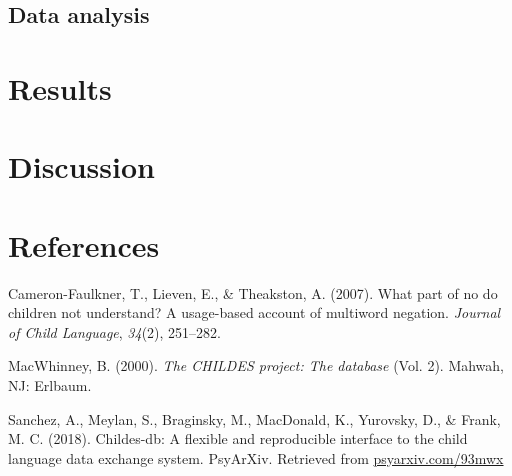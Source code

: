 \documentclass[man,floatsintext,draftall]{apa6}
\begin{document}
\hypertarget{data-analysis}{%
\subsection{Data analysis}\label{data-analysis}}

\hypertarget{results-1}{%
\section{Results}\label{results-1}}

\hypertarget{discussion}{%
\section{Discussion}\label{discussion}}

\newpage

\hypertarget{references}{%
\section{References}\label{references}}

\begingroup
\setlength{\parindent}{-0.5in}
\setlength{\leftskip}{0.5in}

\endgroup

\hypertarget{refs}{}
\leavevmode\hypertarget{ref-cameron2007part}{}%
Cameron-Faulkner, T., Lieven, E., \& Theakston, A. (2007). What part of no do children not understand? A usage-based account of multiword negation. \emph{Journal of Child Language}, \emph{34}(2), 251--282.

\leavevmode\hypertarget{ref-macwhinney2000childes}{}%
MacWhinney, B. (2000). \emph{The CHILDES project: The database} (Vol. 2). Mahwah, NJ: Erlbaum.

\leavevmode\hypertarget{ref-sanchez2018childes}{}%
Sanchez, A., Meylan, S., Braginsky, M., MacDonald, K., Yurovsky, D., \& Frank, M. C. (2018). Childes-db: A flexible and reproducible interface to the child language data exchange system. PsyArXiv. Retrieved from \url{psyarxiv.com/93mwx}
\end{document}
